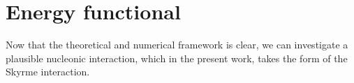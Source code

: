 \section{Energy functional}
Now that the theoretical and numerical framework is clear, we can investigate a plausible nucleonic interaction, which in the present work, takes the form of the Skyrme interaction.


